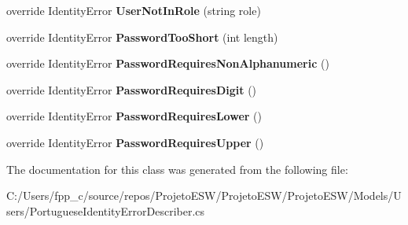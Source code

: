 \begin{DoxyCompactItemize}
\mbox{\label{class_projeto_e_s_w_1_1_models_1_1_portuguese_identity_error_describer_a48b15148fb1240e44083231eacb33fdf}} 
override Identity\+Error {\bfseries User\+Not\+In\+Role} (string role)
\item 
\mbox{\label{class_projeto_e_s_w_1_1_models_1_1_portuguese_identity_error_describer_abe44784a34f7f0ba629c22229b154498}} 
override Identity\+Error {\bfseries Password\+Too\+Short} (int length)
\item 
\mbox{\label{class_projeto_e_s_w_1_1_models_1_1_portuguese_identity_error_describer_af4a629774128c0c9d330cb6366f427cc}} 
override Identity\+Error {\bfseries Password\+Requires\+Non\+Alphanumeric} ()
\item 
\mbox{\label{class_projeto_e_s_w_1_1_models_1_1_portuguese_identity_error_describer_a399c70d3a35a212953e45b702c2752fc}} 
override Identity\+Error {\bfseries Password\+Requires\+Digit} ()
\item 
\mbox{\label{class_projeto_e_s_w_1_1_models_1_1_portuguese_identity_error_describer_a5315b05a17d75fb551c1490466dd1624}} 
override Identity\+Error {\bfseries Password\+Requires\+Lower} ()
\item 
\mbox{\label{class_projeto_e_s_w_1_1_models_1_1_portuguese_identity_error_describer_a9ab5847b0894fe3c4832c248428d7a24}} 
override Identity\+Error {\bfseries Password\+Requires\+Upper} ()
\end{DoxyCompactItemize}


The documentation for this class was generated from the following file\+:\begin{DoxyCompactItemize}
\item 
C\+:/\+Users/fpp\+\_\+c/source/repos/\+Projeto\+E\+S\+W/\+Projeto\+E\+S\+W/\+Projeto\+E\+S\+W/\+Models/\+Users/Portuguese\+Identity\+Error\+Describer.\+cs\end{DoxyCompactItemize}
